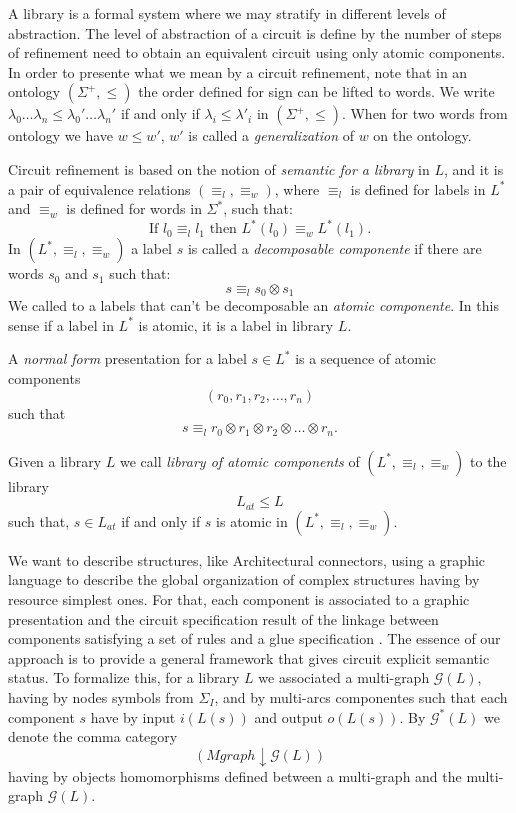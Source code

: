 \documentclass[oribibl]{llncs}
\newcommand{\G}{\mathcal{G}}
\begin{document}
A library is a formal system where we may stratify in different levels of abstraction. The level of abstraction of a circuit is define by the number of steps of refinement need to obtain an equivalent circuit using only atomic components. In order to presente what we mean by a circuit refinement, note that in an ontology $(\Sigma^+,\leq)$ the order defined for sign can be lifted to words. We write $\lambda_0\ldots\lambda_n\leq\lambda_0'\ldots\lambda_n'$ if and only if $\lambda_i\leq\lambda'_i$ in $(\Sigma^+,\leq)$. When for two words from ontology we have $w\leq w'$, $w'$ is called a \emph{generalization} of $w$ on the ontology.

Circuit refinement is based on the notion of \emph{semantic for a library} in $L$, and it is a pair of equivalence relations
 $(\equiv_l,\equiv_w)$, where $\equiv_l$ is defined for labels in $L^\ast$ and $\equiv_w$ is
 defined for words in $\Sigma^\ast$, such that:
\[
\text{If } l_0\equiv_l l_1 \text{ then } L^\ast(l_0)\equiv_w L^\ast(l_1).
\]
In $(L^\ast,\equiv_l,\equiv_w)$ a label $s$ is called a \emph{decomposable componente} if there are words $s_0$ and $s_1$ such that:
\[
s\equiv_l s_0\otimes s_1
\]
  We called to a labels that can't be decomposable  an \emph{atomic componente}. In this sense if a label in $L^\ast$ is atomic, it is a label in library $L$.

A \emph{normal form} presentation for a label $s\in L^\ast$ is a sequence of atomic components
\[
(r_0,r_1,r_2,\ldots,r_n)
\]
such that
\[
s\equiv_l r_0\otimes r_1\otimes r_2\otimes\ldots\otimes r_n.
\]

Given a library $L$ we call \emph{library of atomic components} of $(L^\ast,\equiv_l,\equiv_w)$ to the library \[L_{at}\leq L\] such that,  $s\in L_{at}$ if and only if $s$ is atomic in $(L^\ast,\equiv_l,\equiv_w)$.

We want to describe structures, like Architectural connectors, using a graphic language to describe the global organization of complex structures having by resource simplest ones. For that, each component is associated to a graphic presentation and the circuit specification result of the linkage between components satisfying a set of rules and a glue specification \cite{Allen97}. The essence of our approach is to provide a general framework that gives circuit explicit semantic status. To formalize this, for a library $L$ we associated a  multi-graph $\G(L)$, having by nodes symbols from $\Sigma_I$, and by multi-arcs componentes such that each component $s$ have by input $i(L(s))$ and output $o(L(s))$.
By $\G^\ast(L)$ we denote the comma category
\[(Mgraph\downarrow\G(L))\]
having by objects homomorphisms defined between a multi-graph and the multi-graph $\G(L)$.
\end{document}
